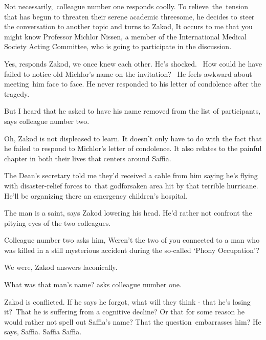 \documentclass[twoside,11pt]{book}
\begin{document}
{\textquotedbl}Not necessarily,{\textquotedbl}\ colleague number one responds coolly. To relieve~the~tension that has
begun to threaten their serene academic threesome, he decides to steer the conversation to another topic and turns to
Zakod, {\textquotedbl}It occurs to me that you might know Professor Michlor Nissen, a member of the International
Medical Society Acting Committee, who is going to participate in the discussion.{\textquotedbl} 

{\textquotedbl}Yes,{\textquotedbl} responds Zakod, {\textquotedbl}we once knew each other.{\textquotedbl} He's shocked.
~How could he have failed to notice old Michlor's name on the invitation? ~He feels awkward about meeting\  him face to
face. He never responded to his letter of condolence after the tragedy.\ \ 

{\textquotedbl}But I heard that he asked to have his name removed from the list of participants,{\textquotedbl} says
colleague number two. 

{\textquotedbl}Oh,{\textquotedbl} Zakod is not displeased to learn. It doesn't only have to do with the fact that he
failed to respond to Michlor's letter of condolence. It also relates to the painful chapter in both their lives that
centers around Saffia.

{\textquotedbl}The Dean's secretary told me they'd received a cable from him saying he's flying with disaster-relief
forces to{\ }that godforsaken area hit by that terrible hurricane. He'll be organizing there an
emergency children's hospital.{\textquotedbl} 

{\textquotedbl}The man is a saint,{\textquotedbl} says Zakod lowering his head. He'd rather not confront the pitying
eyes of the two colleagues. 

Colleague number two asks him, {\textquotedbl}Weren't the two of you connected to a man who was killed in a still
mysterious accident during the so-called `Phony Occupation'?{\textquotedbl} 

{\textquotedbl}We were,{\textquotedbl} Zakod answers laconically. 

{\textquotedbl}What was that man's name?{\textquotedbl} asks colleague number one.

Zakod is conflicted. If he says he forgot, what will they think - that he's losing it?{\ }That he is
suffering from a cognitive decline? Or that for some reason he would rather not spell out Saffia's name? That the
question~embarrasses him? He says, {\textquotedbl}Saffia. Saffia Saffia.{\textquotedbl} 
\end{document}
